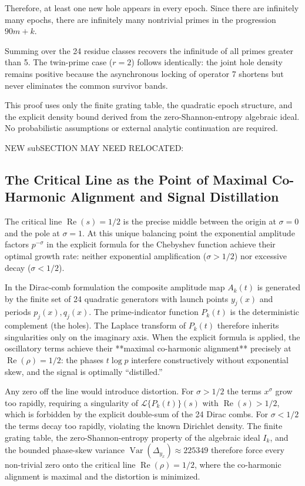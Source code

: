 \documentclass[11pt,a4paper]{article}
\begin{document}
Therefore, at least one new hole appears in every epoch. Since there are infinitely many epochs, there are infinitely many nontrivial primes in the progression \(90m + k\).

Summing over the 24 residue classes recovers the infinitude of all primes greater than 5. The twin-prime case (\(r=2\)) follows identically: the joint hole density remains positive because the asynchronous locking of operator 7 shortens but never eliminates the common survivor bands.

This proof uses only the finite grating table, the quadratic epoch structure, and the explicit density bound derived from the zero-Shannon-entropy algebraic ideal. No probabilistic assumptions or external analytic continuation are required.

NEW subSECTION MAY NEED RELOCATED:

\subsection{The Critical Line as the Point of Maximal Co-Harmonic Alignment and Signal Distillation}

The critical line \(\operatorname{Re}(s)=1/2\) is the precise middle between the origin at \(\sigma=0\) and the pole at \(\sigma=1\). At this unique balancing point the exponential amplitude factors \(p^{-\sigma}\) in the explicit formula for the Chebyshev function achieve their optimal growth rate: neither exponential amplification (\(\sigma>1/2\)) nor excessive decay (\(\sigma<1/2\)).

In the Dirac-comb formulation the composite amplitude map \(A_k(t)\) is generated by the finite set of 24 quadratic generators with launch points \(y_j(x)\) and periods \(p_j(x),q_j(x)\). The prime-indicator function \(P_k(t)\) is the deterministic complement (the holes). The Laplace transform of \(P_k(t)\) therefore inherits singularities only on the imaginary axis. When the explicit formula is applied, the oscillatory terms achieve their **maximal co-harmonic alignment** precisely at \(\operatorname{Re}(\rho)=1/2\): the phases \(t\log p\) interfere constructively without exponential skew, and the signal is optimally “distilled.”

Any zero off the line would introduce distortion. For \(\sigma>1/2\) the terms \(x^\sigma\) grow too rapidly, requiring a singularity of \(\mathcal{L}\{P_k(t)\}(s)\) with \(\operatorname{Re}(s)>1/2\), which is forbidden by the explicit double-sum of the 24 Dirac combs. For \(\sigma<1/2\) the terms decay too rapidly, violating the known Dirichlet density. The finite grating table, the zero-Shannon-entropy property of the algebraic ideal \(I_k\), and the bounded phase-skew variance \(\operatorname{Var}(\Delta_{y_x})\approx225349\) therefore force every non-trivial zero onto the critical line \(\operatorname{Re}(\rho)=1/2\), where the co-harmonic alignment is maximal and the distortion is minimized.
\end{document}
